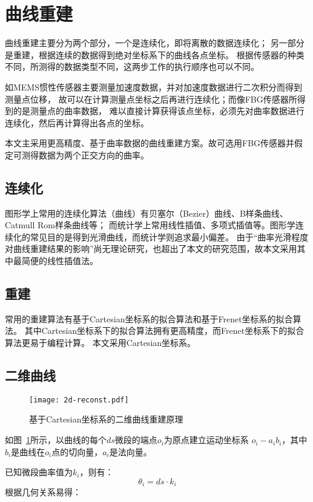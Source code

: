 \cleardoublepage

\section{曲线重建}

曲线重建主要分为两个部分，一个是连续化，即将离散的数据连续化；
另一部分是重建，根据连续的数据得到绝对坐标系下的曲线各点坐标。
根据传感器的种类不同，所测得的数据类型不同，这两步工作的执行顺序也可以不同。

如MEMS惯性传感器主要测量加速度数据，并对加速度数据进行二次积分而得到测量点位移，
故可以在计算测量点坐标之后再进行连续化；而像FBG传感器\cite{FBG-sensor-devices}所得到的是测量点的曲率数据，
难以直接计算获得该点坐标，必须先对曲率数据进行连续化，然后再计算得出各点的坐标。

本文主采用更高精度、基于曲率数据的曲线重建方案。故可选用FBG传感器并假定可测得数据为两个正交方向的曲率。

\subsection{连续化}
图形学上常用的连续化算法（曲线）有贝塞尔（Bezier）曲线、B样条曲线、Catmull Rom样条曲线等；
而统计学上常用线性插值、多项式插值等。图形学连续化的常见目的是得到光滑曲线，而统计学则追求最小偏差。
由于“曲率光滑程度对曲线重建结果的影响”尚无理论研究，也超出了本文的研究范围，故本文采用其中最简便的线性插值法。

\subsection{重建}
常用的重建算法有基于Cartesian坐标系的拟合算法和基于Frenet坐标系的拟合算法。
其中Cartesian坐标系下的拟合算法拥有更高精度，而Frenet坐标系下的拟合算法更易于编程计算。
本文采用Cartesian坐标系。


\subsection{二维曲线}

\begin{figure}
\centering
\texttt{[image: 2d-reconst.pdf]}
\caption{基于Cartesian坐标系的二维曲线重建原理}
\label{fig:2d-reconst} 
\end{figure}

如图~\ref{fig:2d-reconst}所示，以曲线的每个$ds$微段的端点$o_i$为原点建立运动坐标系 $o_i-a_ib_i$，其中$b_i$是曲线在$o_i$点的切向量，$a_i$是法向量。

已知微段曲率值为$k_i$，则有：
\begin{equation}
\theta_i = ds\cdot k_i
\end{equation}
根据几何关系易得：

